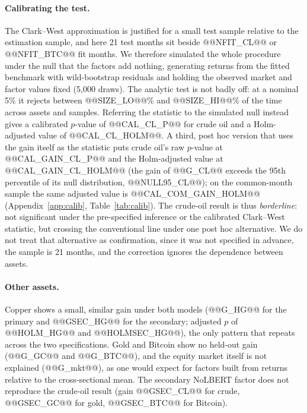 \documentclass[11pt]{article}
\begin{document}
\paragraph{Calibrating the test.} The Clark--West approximation is justified for a small test sample relative to the estimation sample, and here 21 test months sit beside @@NFIT_CL@@ or @@NFIT_BTC@@ fit months. We therefore simulated the whole procedure under the null that the factors add nothing, generating returns from the fitted benchmark with wild-bootstrap residuals and holding the observed market and factor values fixed (5{,}000 draws). The analytic test is not badly off: at a nominal 5\% it rejects between @@SIZE_LO@@\% and @@SIZE_HI@@\% of the time across assets and samples. Referring the statistic to the simulated null instead gives a calibrated $p$-value of @@CAL_CL_P@@ for crude oil and a Holm-adjusted value of @@CAL_CL_HOLM@@. A third, post hoc version that uses the gain itself as the statistic puts crude oil's raw $p$-value at @@CAL_GAIN_CL_P@@ and the Holm-adjusted value at @@CAL_GAIN_CL_HOLM@@ (the gain of @@G_CL@@ exceeds the 95th percentile of its null distribution, @@NULL95_CL@@); on the common-month sample the same adjusted value is @@CAL_COM_GAIN_HOLM@@ (Appendix~\ref{app:calib}, Table~\ref{tab:calib}). The crude-oil result is thus \emph{borderline}: not significant under the pre-specified inference or the calibrated Clark--West statistic, but crossing the conventional line under one post hoc alternative. We do not treat that alternative as confirmation, since it was not specified in advance, the sample is 21 months, and the correction ignores the dependence between assets.

\paragraph{Other assets.} Copper shows a small, similar gain under both models (@@G_HG@@ for the primary and @@GSEC_HG@@ for the secondary; adjusted $p$ of @@HOLM_HG@@ and @@HOLMSEC_HG@@), the only pattern that repeats across the two specifications. Gold and Bitcoin show no held-out gain (@@G_GC@@ and @@G_BTC@@), and the equity market itself is not explained (@@G_mkt@@), as one would expect for factors built from returns relative to the cross-sectional mean. The secondary NoLBERT factor does not reproduce the crude-oil result (gain @@GSEC_CL@@ for crude, @@GSEC_GC@@ for gold, @@GSEC_BTC@@ for Bitcoin).
\end{document}
